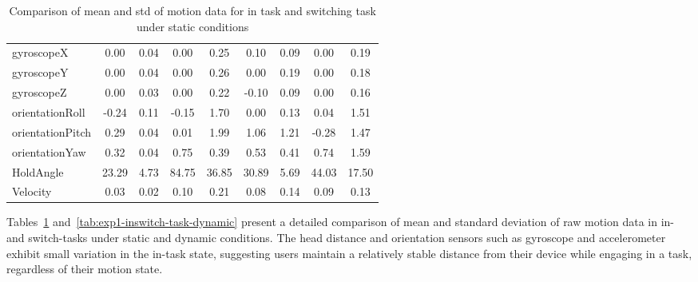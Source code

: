 \begin{table}[!htbp]
\begin{tabular}{l|cccccccc}
gyroscopeX & 0.00 & {\cellcolor[rgb]{0.388,0.745,0.482}}0.04 & 0.00 & {\cellcolor[rgb]{0.973,0.412,0.42}}0.25 & 0.10 & {\cellcolor[rgb]{0.718,0.839,0.498}}0.09 & 0.00 & {\cellcolor[rgb]{0.992,0.71,0.478}}0.19 \\
gyroscopeY & 0.00 & {\cellcolor[rgb]{0.388,0.745,0.482}}0.04 & 0.00 & {\cellcolor[rgb]{0.973,0.412,0.42}}0.26 & 0.00 & {\cellcolor[rgb]{1,0.894,0.514}}0.19 & 0.00 & {\cellcolor[rgb]{0.98,0.914,0.514}}0.18 \\
gyroscopeZ & 0.00 & {\cellcolor[rgb]{0.388,0.745,0.482}}0.03 & 0.00 & {\cellcolor[rgb]{0.973,0.412,0.42}}0.22 & -0.10 & {\cellcolor[rgb]{0.773,0.855,0.502}}0.09 & 0.00 & {\cellcolor[rgb]{0.992,0.718,0.478}}0.16 \\
orientationRoll & -0.24 & {\cellcolor[rgb]{0.388,0.745,0.482}}0.11 & -0.15 & {\cellcolor[rgb]{0.973,0.412,0.42}}1.70 & 0.00 & {\cellcolor[rgb]{0.404,0.749,0.482}}0.13 & 0.04 & {\cellcolor[rgb]{0.98,0.525,0.443}}1.51 \\
orientationPitch & 0.29 & {\cellcolor[rgb]{0.388,0.745,0.482}}0.04 & 0.01 & {\cellcolor[rgb]{0.973,0.412,0.42}}1.99 & 1.06 & {\cellcolor[rgb]{1,0.898,0.514}}1.21 & -0.28 & {\cellcolor[rgb]{0.992,0.737,0.482}}1.47 \\
orientationYaw & 0.32 & {\cellcolor[rgb]{0.388,0.745,0.482}}0.04 & 0.75 & {\cellcolor[rgb]{0.976,0.914,0.514}}0.39 & 0.53 & {\cellcolor[rgb]{1,0.918,0.518}}0.41 & 0.74 & {\cellcolor[rgb]{0.973,0.412,0.42}}1.59 \\
HoldAngle & 23.29 & {\cellcolor[rgb]{0.388,0.745,0.482}}4.73 & 84.75 & {\cellcolor[rgb]{0.973,0.412,0.42}}36.85 & 30.89 & {\cellcolor[rgb]{0.471,0.769,0.486}}5.69 & 44.03 & {\cellcolor[rgb]{0.996,0.804,0.498}}17.50 \\
Velocity & 0.03 & {\cellcolor[rgb]{0.388,0.745,0.482}}0.02 & 0.10 & {\cellcolor[rgb]{0.973,0.412,0.42}}0.21 & 0.08 & {\cellcolor[rgb]{1,0.894,0.514}}0.14 & 0.09 & {\cellcolor[rgb]{0.976,0.914,0.514}}0.13 \\
\hline
\end{tabular}
\caption{Comparison of mean and std of motion data for in task and switching task under static conditions}\label{tab:exp1-inswitch-task-static}
\end{table}


Tables~\ref{tab:exp1-inswitch-task-static} and~\ref{tab:exp1-inswitch-task-dynamic} present a detailed comparison of mean and standard deviation of raw motion data in in- and switch-tasks under static and dynamic conditions. The head distance and orientation sensors such as gyroscope and accelerometer exhibit small variation in the in-task state, suggesting users maintain a relatively stable distance from their device while engaging in a task, regardless of their motion state. 


